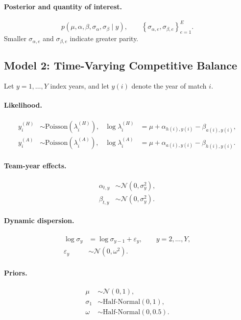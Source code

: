 \documentclass[11pt]{article}
\begin{document}
\paragraph{Posterior and quantity of interest.}
\[
p\!\left(\mu,\alpha,\beta,\sigma_\alpha,\sigma_\beta \mid y\right),
\qquad
\left\{\sigma_{\alpha,e},\sigma_{\beta,e}\right\}_{e=1}^E.
\]
Smaller \(\sigma_{\alpha,e}\) and \(\sigma_{\beta,e}\) indicate greater parity.

\subsection{Model 2: Time-Varying Competitive Balance}

Let \(y=1,\dots,Y\) index years, and let \(y(i)\) denote the year of match \(i\).

\paragraph{Likelihood.}
\begin{align}
y_i^{(H)} &\sim \mathrm{Poisson}\!\left(\lambda_i^{(H)}\right), &
\log \lambda_i^{(H)} &= \mu + \alpha_{h(i),y(i)} - \beta_{a(i),y(i)}, \\
y_i^{(A)} &\sim \mathrm{Poisson}\!\left(\lambda_i^{(A)}\right), &
\log \lambda_i^{(A)} &= \mu + \alpha_{a(i),y(i)} - \beta_{h(i),y(i)}.
\end{align}

\paragraph{Team-year effects.}
\begin{align}
\alpha_{t,y} &\sim \mathcal{N}\!\left(0,\sigma_y^2\right), \\
\beta_{t,y}  &\sim \mathcal{N}\!\left(0,\sigma_y^2\right).
\end{align}

\paragraph{Dynamic dispersion.}
\begin{align}
\log \sigma_y &= \log \sigma_{y-1} + \varepsilon_y, \qquad y=2,\dots,Y, \\
\varepsilon_y &\sim \mathcal{N}\!\left(0,\omega^2\right).
\end{align}

\paragraph{Priors.}
\begin{align}
\mu &\sim \mathcal{N}(0,1), \\
\sigma_1 &\sim \mathrm{Half\text{-}Normal}(0,1), \\
\omega &\sim \mathrm{Half\text{-}Normal}(0,0.5).
\end{align}
\end{document}
